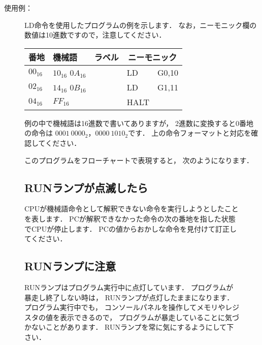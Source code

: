 \begin{description}
\item[使用例：]LD命令を使用したプログラムの例を示します．
なお，ニーモニック欄の数値は10進数ですので，注意してください．

{\tt\small\begin{center}
\begin{tabular}{|l|l|l|l l|} \hline
番地 & 機械語 & ラベル & \multicolumn{2}{|c|}{ニーモニック} \\
\hline
$00_{16}$ & $10_{16}$ $0A_{16}$ & & LD   & G0,10 \\
$02_{16}$ & $14_{16}$ $0B_{16}$ & & LD   & G1,11 \\
$04_{16}$ & $FF_{16}$           & & HALT &       \\
\hline
\end{tabular}
\end{center}}

例の中で機械語は16進数で書いてありますが，
2進数に変換すると0番地の命令は $0001~0000_2$，$0000~1010_2$です．
上の命令フォーマットと対応を確認してください．

このプログラムをフローチャートで表現すると，
次のようになります．

\begin{center}
\end{center}

\end{description}

\begin{figure}[tbp]
\begin{framed}
\subsection*{RUNランプが点滅したら}
CPUが機械語命令として解釈できない命令を実行しようとしたことを表します．
PCが解釈できなかった命令の次の番地を指した状態でCPUが停止します．
PCの値からおかしな命令を見付けて訂正してください．
\end{framed}
\end{figure}

\begin{figure}[btp]
\begin{framed}
\subsection*{RUNランプに注意}
RUNランプはプログラム実行中に点灯しています．
プログラムが暴走し終了しない時は，
RUNランプが点灯したままになります．
プログラム実行中でも，
コンソールパネルを操作してメモリやレジスタの値を表示できるので，
プログラムが暴走していることに気づかないことがあります．
RUNランプを常に気にするようにして下さい．
\end{framed}
\end{figure}

